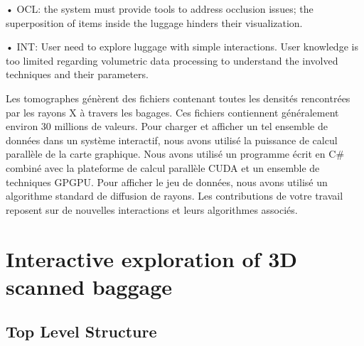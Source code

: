 •	OCL: the system must provide tools to address occlusion issues; the
superposition of items inside the luggage hinders their visualization.

•	INT: User need to explore luggage with simple interactions. User knowledge is too limited regarding volumetric data processing to understand the involved techniques and their parameters.


Les tomographes génèrent des fichiers contenant toutes les densités rencontrées par les rayons X à travers les bagages. Ces fichiers contiennent généralement environ 30 millions de valeurs. Pour charger et afficher un tel ensemble de données dans un système interactif, nous avons utilisé la puissance de calcul parallèle de la carte graphique. Nous avons utilisé un programme écrit en C\# combiné avec la plateforme de calcul parallèle CUDA et un ensemble de techniques GPGPU. Pour afficher le jeu de données, nous avons utilisé un algorithme standard de diffusion de rayons. Les contributions de votre travail reposent sur de nouvelles interactions et leurs algorithmes associés.


\section{ Interactive exploration of 3D scanned baggage }

\subsection{Top Level Structure}

